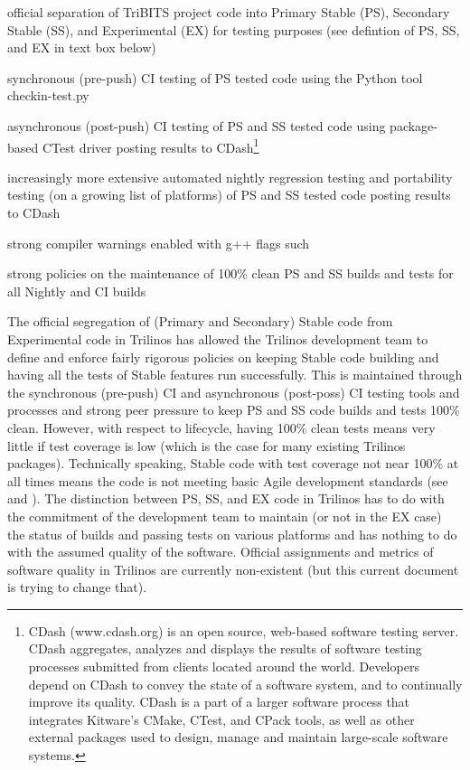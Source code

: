\documentclass[11pt]{SANDreport}
\begin{document}
\begin{compactitem}

{}\item official separation of TriBITS project code into Primary Stable (PS),
Secondary Stable (SS), and Experimental (EX) for testing purposes (see
defintion of PS, SS, and EX in text box below)

{}\item synchronous (pre-push) CI testing of PS tested code using the
Python tool checkin-test.py

{}\item asynchronous (post-push) CI testing of PS and SS tested code
using package-based CTest driver posting results to
CDash\footnote{CDash (www.cdash.org) is an open source, web-based
software testing server. CDash aggregates, analyzes and displays the
results of software testing processes submitted from clients located
around the world. Developers depend on CDash to convey the state of a
software system, and to continually improve its quality. CDash is a
part of a larger software process that integrates Kitware's CMake,
CTest, and CPack tools, as well as other external packages used to
design, manage and maintain large-scale software systems.}

{}\item increasingly more extensive automated nightly regression
testing and portability testing (on a growing list of platforms) of PS
and SS tested code posting results to CDash

{}\item strong compiler warnings enabled with g++ flags such
{}

{}\item strong policies on the maintenance of 100\% clean PS and SS
builds and tests for all Nightly and CI builds

\end{compactitem}

The official segregation of (Primary and Secondary) Stable code from
Experimental code in Trilinos has allowed the Trilinos development
team to define and enforce fairly rigorous policies on keeping Stable
code building and having all the tests of Stable features run
successfully.  This is maintained through the synchronous (pre-push)
CI and asynchronous (post-poss) CI testing tools and processes and
strong peer pressure to keep PS and SS code builds and tests 100\%
clean.  However, with respect to lifecycle, having 100\% clean tests
means very little if test coverage is low (which is the case for many
existing Trilinos packages).  Technically speaking, Stable code with
test coverage not near 100\% at all times means the code is not
meeting basic Agile development standards (see {}\cite{XP2} and
{}\cite{CodeComplete2nd04}).  The distinction between PS, SS, and EX
code in Trilinos has to do with the commitment of the development team
to maintain (or not in the EX case) the status of builds and passing
tests on various platforms and has nothing to do with the assumed
quality of the software.  Official assignments and metrics of software
quality in Trilinos are currently non-existent (but this current
document is trying to change that).
\end{document}
